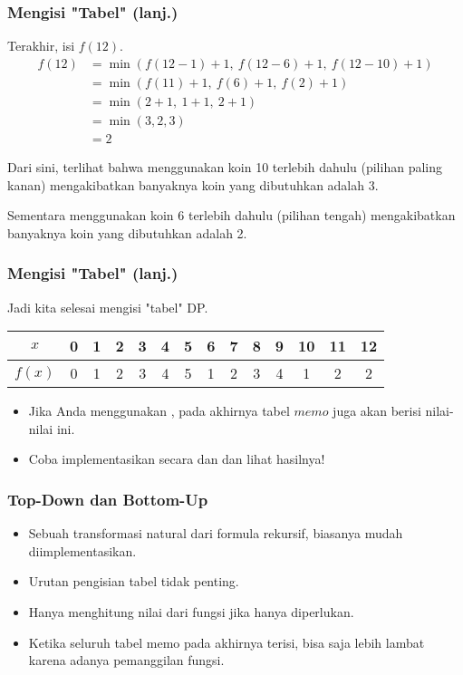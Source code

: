 \begin{frame}
\frametitle{Mengisi "Tabel" (lanj.)}
Terakhir, isi $f(12)$.
\begin{align*}
  f(12) &= \min(f(12-1) + 1, \ f(12-6) + 1, \ f(12-10) + 1) \\
  &= \min(f(11) + 1, \ f(6) + 1, \ f(2) + 1) \\
  &= \min(2 + 1, \ 1 + 1, \ 2 + 1) \\
  &= \min(3, 2, 3) \\
  &= 2
\end{align*}

Dari sini, terlihat bahwa menggunakan koin 10 terlebih dahulu (pilihan paling kanan) mengakibatkan banyaknya koin yang dibutuhkan adalah 3.\newline

Sementara menggunakan koin 6 terlebih dahulu (pilihan tengah) mengakibatkan banyaknya koin yang dibutuhkan adalah 2.
\end{frame}

\begin{frame}
\frametitle{Mengisi "Tabel" (lanj.)}
Jadi kita selesai mengisi "tabel" DP.\newline

\begin{tabular}{|c|c|c|c|c|c|c|c|c|c|c|c|c|c|}
\hline $x$ & 0 & 1 & 2 & 3 & 4 & 5 & 6 & 7 & 8 & 9 & 10 & 11 & 12 \\ 
\hline $f(x)$ &  0 & 1 & 2 & 3 & 4 & 5 & 1 & 2 & 3 & 4 & 1 & 2 & 2 \\ 
\hline 
\end{tabular}
\newline \newline
\begin{itemize}
  \item Jika Anda menggunakan \ftopdown, pada akhirnya tabel $memo$ juga akan berisi nilai-nilai ini.
  \item Coba implementasikan secara \ftopdown dan \fbottomup dan lihat hasilnya!
\end{itemize}
\end{frame}

\begin{frame}
\frametitle{Top-Down dan Bottom-Up}
\fTopdown
\begin{itemize}
  \item Sebuah transformasi natural dari formula rekursif, biasanya mudah diimplementasikan.
  \item Urutan pengisian tabel tidak penting.
  \item Hanya menghitung nilai dari fungsi jika hanya diperlukan.
  \item Ketika seluruh tabel memo pada akhirnya terisi, bisa saja lebih lambat karena adanya 
  \foverhead pemanggilan fungsi.
\end{itemize}
\end{frame}


